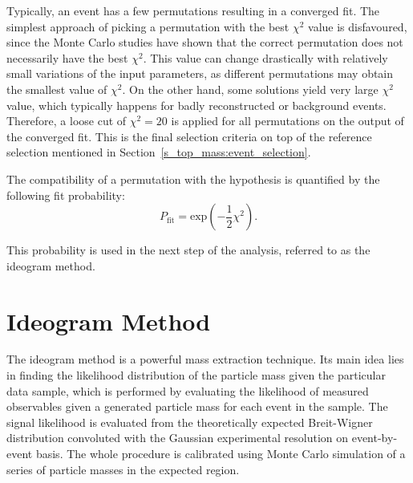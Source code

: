 Typically, an event has a few permutations resulting in a converged fit. The simplest approach of picking a permutation
with the best $\chi^2$ value is disfavoured, since the Monte Carlo studies have shown that the correct permutation
does not necessarily have the best $\chi^2$. This value can change drastically with relatively small variations of the
input parameters, as different permutations may obtain the smallest value of $\chi^2$. On the other hand, some solutions
yield very large $\chi^2$ value, which typically happens for badly reconstructed or background events. Therefore, a
loose cut of $\chi^2=20$ is applied for all permutations on the output of the converged fit. This is the final
selection criteria on top of the reference selection mentioned in Section~\ref{s_top_mass:event_selection}.


The compatibility of a permutation with the \ttbar hypothesis is quantified by the following fit probability:
\begin{equation}
	P_{\textrm{fit}} = \textrm{exp}(-\frac{1}{2}\chi^2).
\end{equation}

This probability is used in the next step of the analysis, referred to as the ideogram method.


\section{Ideogram Method}
\label{s_top_mass:ideogram_method}
The ideogram method is a powerful mass extraction technique. Its main idea lies in finding the likelihood distribution
of the particle mass given the particular data sample, which is performed by evaluating the likelihood of measured
observables given a generated particle mass for each event in the sample. The signal likelihood is evaluated from the
theoretically expected Breit-Wigner distribution convoluted with the Gaussian experimental resolution on event-by-event
basis. The whole procedure is calibrated using Monte Carlo simulation of a series of particle masses in the expected
region.


